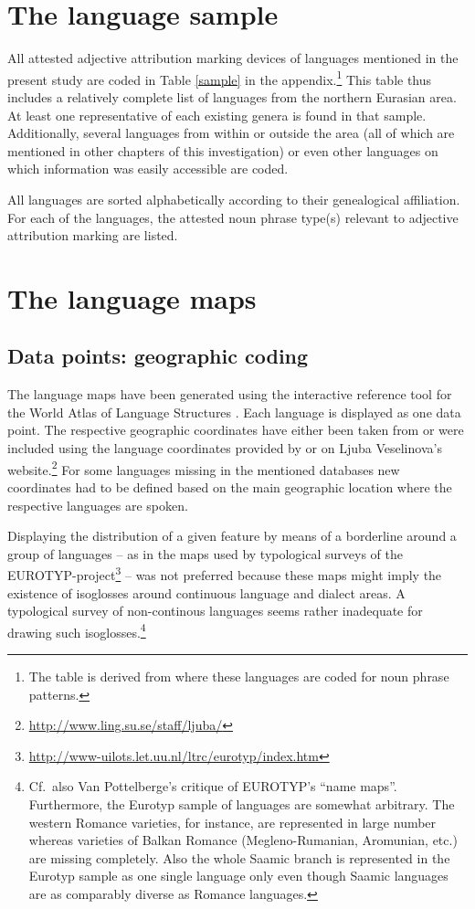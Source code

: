 \section{The language sample}
All attested adjective attribution marking devices of languages mentioned in the present study are coded in Table \ref{sample} in the appendix.\footnote{The table is derived from \citet{AUTOTYP-NP} where these languages are coded for noun phrase patterns.} This table thus includes a relatively complete list of languages from the northern Eurasian area. At least one representative of each existing genera is found in that sample. Additionally, several languages from within or outside the area (all of which are mentioned in other chapters of this investigation) or even other languages on which information was easily accessible are coded.

All languages are sorted alphabetically according to their genealogical affiliation. For each of the languages, the attested noun phrase type(s) relevant to adjective attribution marking are listed.

\section{The language maps}
\subsection[Geographic coding]{Data points: geographic coding}
The language maps have been generated using the interactive reference tool 
for the World Atlas of Language Structures \citep{bibiko2005}. Each language is displayed as one data point. The respective geographic coordinates have either been taken from \cite{WALS} or were included using the language coordinates provided by \cite{AUTOTYP} or on Ljuba Veselinova's website.\footnote{\url{http://www.ling.su.se/staff/ljuba/}} For some languages missing in the mentioned databases new coordinates had to be defined based on the main geographic location where the respective languages are spoken.

Displaying the distribution of a given feature by means of a borderline around a group of languages – as in the maps used by typological surveys of the EUROTYP-project\footnote{\url{http://www-uilots.let.uu.nl/ltrc/eurotyp/index.htm}} – was not preferred because these maps might imply the existence of isoglosses around continuous language and dialect areas. A typological survey of non-continous languages seems rather inadequate for drawing such isoglosses.\footnote{Cf.~also Van Pottelberge's \citeyear{van-pottelberge2001} critique of EUROTYP's “name maps”. Furthermore, the Eurotyp sample of languages are somewhat arbitrary. The western Romance varieties, for instance, are represented in large number whereas varieties of Balkan Romance (Megleno-Rumanian, Aromunian, etc.) are missing completely. Also the whole Saamic branch is represented in the Eurotyp sample as one single language only even though Saamic languages are as comparably diverse as Romance languages.}

